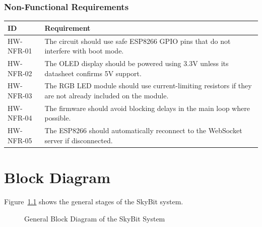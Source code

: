 \documentclass[12pt,a4paper]{report}
\newcommand{\apiURL}{https://skybit-api.mahros.dev/api/v1}
\newcommand{\frontendURL}{https://skybit.mahros.dev}
\begin{document}
\subsection{Non-Functional Requirements}

\begin{longtable}{p{2.5cm} p{11cm}}
\toprule
\textbf{ID} & \textbf{Requirement} \\
\midrule
HW-NFR-01 & The circuit should use safe ESP8266 GPIO pins that do not interfere with boot mode. \\
HW-NFR-02 & The OLED display should be powered using 3.3V unless its datasheet confirms 5V support. \\
HW-NFR-03 & The RGB LED module should use current-limiting resistors if they are not already included on the module. \\
HW-NFR-04 & The firmware should avoid blocking delays in the main loop where possible. \\
HW-NFR-05 & The ESP8266 should automatically reconnect to the WebSocket server if disconnected. \\
\bottomrule
\end{longtable}

\chapter{Block Diagram}

Figure~\ref{fig:block-diagram} shows the general stages of the SkyBit system.

\begin{figure}[H]
\centering
{}
\caption{General Block Diagram of the SkyBit System}
\label{fig:block-diagram}
\end{figure}
\end{document}
